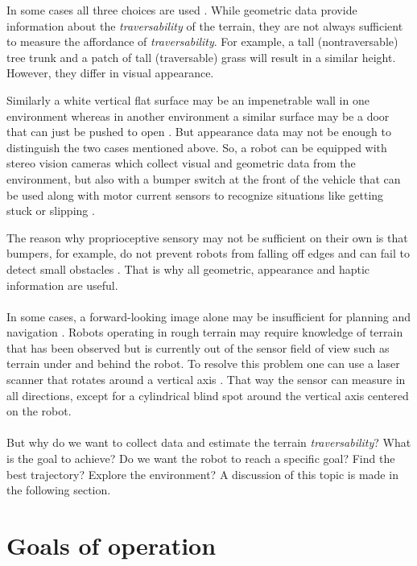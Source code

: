 \documentclass[12pt,a4paper]{report}
\newcommand{\term}{\textit}
\begin{document}
	In some cases all three choices are used \cite{Kim}. While geometric data 
	provide information about the \term{traversability} of the terrain, they are 
	not always sufficient to measure the affordance of \term{traversability}. For 
	example, a tall (nontraversable) tree trunk and a patch of tall (traversable) 
	grass will result in a similar height. However, they differ in visual 
	appearance. 
	\par 
	Similarly a white vertical flat surface may be an impenetrable wall in one 
	environment whereas in another environment a similar surface may be a door that 
	can just be pushed to open \cite{Ugur}. But appearance data may not be enough 
	to distinguish the two cases mentioned above. So, a robot can be equipped with 
	stereo vision cameras which collect visual and geometric data from the 
	environment, but also with a bumper switch at the front of the vehicle that can 
	be used along with motor current sensors to recognize situations like getting 
	stuck or slipping \cite{Kim}.
	\par
	The reason why proprioceptive sensory may not be sufficient on their own is that 
	bumpers, for example, do not prevent robots from falling off edges and can fail 
	to detect small obstacles \cite{HiroseGonet}. That is why all geometric, 
	appearance and haptic information are useful.
	\\\\
	
	
	In some cases, a forward-looking image alone may be insufficient for planning and 
	navigation \cite{Kweon}. Robots operating in rough terrain may require knowledge 
	of terrain that has been observed but is currently out of the sensor field of 
	view such as terrain under and behind the robot. To resolve this problem one can 
	use a laser scanner that rotates around a vertical axis \cite{Droeschel}. That 
	way the sensor can measure in all directions, except for a cylindrical blind spot 
	around the vertical axis centered on the robot.
	\\\\
	
	
	But why do we want to collect data and estimate the terrain \term{traversability}?
	What is the goal to achieve? Do we want the robot to reach a specific goal? Find 
	the best trajectory? Explore the environment? A discussion of this topic is made 
	in the following section.
	\\
	
	\section{Goals of operation}
	\label{sec:bg:goals}
	
\end{document}
